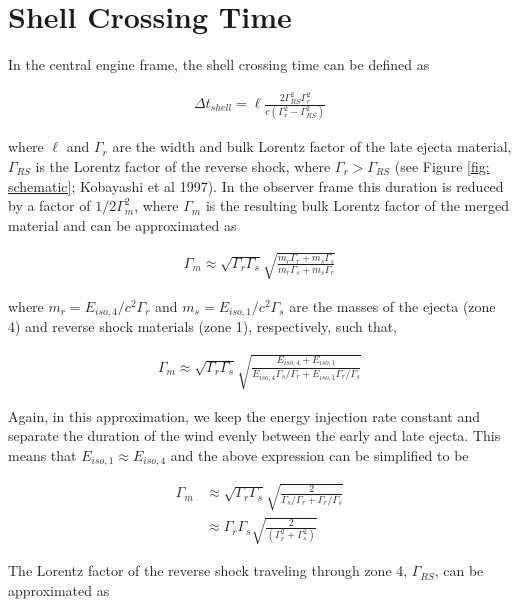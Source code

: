 \documentclass[linenumbers,twocolumn]{aastex631}
\begin{document}
\section{Shell Crossing Time}  
{
    In the central engine frame, the shell crossing time can be defined as

    \begin{align}
        \Delta t_{shell} = \ell \frac{2\Gamma_{RS}^2\Gamma_{r}^2}{c(\Gamma_{r}^2 - \Gamma_{RS}^2)}
    \end{align}

    where $\ell$ and $\Gamma_{r}$ are the width and bulk Lorentz factor of the late ejecta material, $\Gamma_{RS}$ is the Lorentz factor of the reverse shock, where $\Gamma_r > \Gamma_{RS}$ (see Figure \ref{fig: schematic}; Kobayashi et al 1997). In the observer frame this duration is reduced by a factor of $1/2\Gamma_m^2$, where $\Gamma_m$ is the resulting bulk Lorentz factor of the merged material and can be approximated as 

    \begin{align}
        \Gamma_m \approx \sqrt{\Gamma_{r}\Gamma_{s}}\sqrt{\frac{m_{r}\Gamma_{r} + m_{s}\Gamma_{s}}{m_{r}\Gamma_{s} + m_{s}\Gamma_{r}}}
    \end{align}

    where $m_{r} = E_{iso,4}/c^2\Gamma_r$ and $m_{s} = E_{iso,1}/c^2\Gamma_s$ are the masses of the ejecta (zone 4) and reverse shock materials (zone 1), respectively, such that,

    \begin{align}
        \Gamma_m \approx \sqrt{\Gamma_{r}\Gamma_{s}}\sqrt{\frac{E_{iso,4} + E_{iso,1}}{E_{iso,4} \Gamma_{s}/\Gamma_{r} + E_{iso,1} \Gamma_{r}/\Gamma_{s}}}
    \end{align}

    Again, in this approximation, we keep the energy injection rate constant and separate the duration of the wind evenly between the early and late ejecta. This means that $E_{iso,1}\approx E_{iso,4}$ and the above expression can be simplified to be 

    \begin{align}
        \Gamma_m &\approx \sqrt{\Gamma_{r}\Gamma_{s}}\sqrt{\frac{2}{\Gamma_{s}/\Gamma_{r} + \Gamma_{r}/\Gamma_{s}}} \\
        & \approx \Gamma_r\Gamma_s \sqrt{\frac{2}{(\Gamma_r^2 + \Gamma_s^2)}}
    \end{align}    

    The Lorentz factor of the reverse shock traveling through zone 4, $\Gamma_{RS}$, can be approximated as 

}
\end{document}
